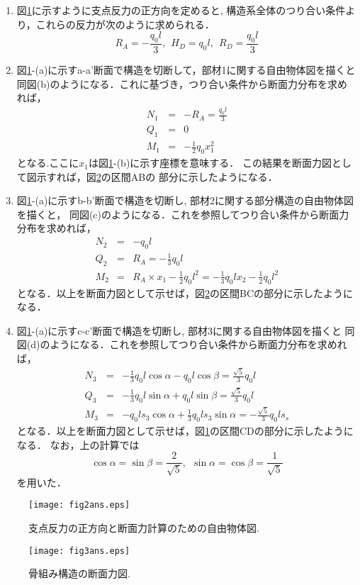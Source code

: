 ﻿\documentclass[10pt,a4j]{jarticle}
\begin{document}
\begin{enumerate}
\item
図\ref{fig:fig3}に示すように支点反力の正方向を定めると,
構造系全体のつり合い条件より，これらの反力が次のように求められる．
\begin{equation}
	R_A=-\frac{q_0l}{3}, \ \ 
	H_D=q_0l, \ \ 
	R_D=\frac{q_0l}{3}
\end{equation}
\item
図\ref{fig:fig3}-(a)に示すa-a'断面で構造を切断して，部材1に関する自由物体図を描くと
同図(b)のようになる．これに基づき，つり合い条件から断面力分布を求めれば，
\begin{eqnarray}
	N_1 &=&-R_A=\frac{q_0l}{3} \\
	Q_1 &=& 0 \\ 
	M_1 &=&-\frac{1}{2} q_0x_1^2 
\end{eqnarray}
となる.ここに$x_1$は図\ref{fig:fig3}-(b)に示す座標を意味する．
この結果を断面力図として図示すれば，図\ref{fig:fig4}の区間ABの
部分に示したようになる．
\item
図\ref{fig:fig3}-(a)に示すb-b'断面で構造を切断し, 部材2に関する部分構造の自由物体図を描くと，
同図(c)のようになる．これを参照してつり合い条件から断面力分布を求めれば，
\begin{eqnarray}
	N_2 &=& -q_0l \\
	Q_2 &=& R_A= -\frac{1}{3}q_0l \\
	M_2 &=& R_A\times x_1 -\frac{1}{2}q_0l^2 = -\frac{1}{3}q_0lx_2-\frac{1}{2}q_0l^2
\end{eqnarray}
となる．以上を断面力図として示せば，図\ref{fig:fig4}の区間BCの部分に示したようになる．
\item
図\ref{fig:fig3}-(a)に示すc-c'断面で構造を切断し, 部材3に関する自由物体図を描くと
同図(d)のようになる．これを参照してつり合い条件から断面力分布を求めれば，
\begin{eqnarray}
	N_3 &=&-\frac{1}{3}q_0l\cos \alpha - q_0l \cos \beta = \frac{\sqrt{5}}{3}q_0l \\
	Q_3 &=&-\frac{1}{3}q_0l\sin\alpha +q_0l\sin\beta = \frac{\sqrt{5}}{3}q_0l \\
	M_3 &=&-q_0ls_3\cos\alpha+\frac{1}{3}q_0ls_3\sin\alpha= -\frac{\sqrt{5}}{3}q_0ls_s 
\end{eqnarray}
となる．以上を断面力図として示せば，図\ref{fig:fig3}の区間CDの部分に示したようになる．
なお，上の計算では
	\begin{equation}
		\cos\alpha=\sin\beta = \frac{2}{\sqrt{5}}, \ \ 
		\sin\alpha=\cos\beta = \frac{1}{\sqrt{5}}
	\end{equation}
を用いた．
\end{enumerate}
\begin{figure}[h]
	\begin{center}
	\texttt{[image: fig2ans.eps]} 
	\end{center}
	\caption{支点反力の正方向と断面力計算のための自由物体図.} 
	\label{fig:fig3}
\end{figure}
\begin{figure}[h]
	\begin{center}
	\texttt{[image: fig3ans.eps]} 
	\end{center}
	\caption{骨組み構造の断面力図.} 
	\label{fig:fig4}
\end{figure}
\end{document}
